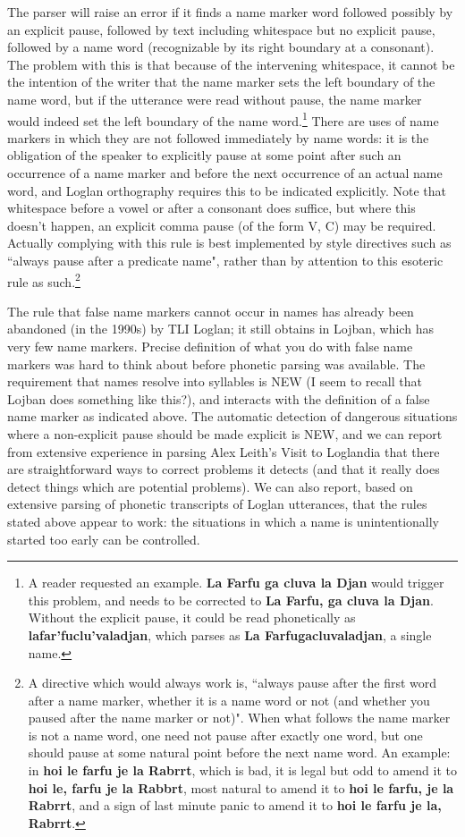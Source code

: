 \documentclass[12pt]{book}
\begin{document}
The parser will raise an error if it finds a name marker word followed possibly by an explicit pause, followed by text including whitespace but no explicit pause, followed by a name word (recognizable by its right boundary at a consonant). The problem with this is that because of the intervening whitespace, it cannot be  the intention of the writer that the name marker sets the left boundary of the name word, but if the utterance were read without pause, the name marker would indeed set the left boundary of the name word.\footnote{A reader requested an example.  {\bf La Farfu ga cluva la Djan} would trigger this problem, and needs to be corrected to {\bf La Farfu, ga cluva la Djan}.  Without the explicit pause, it could be read phonetically as {\bf lafar'fuclu'valadjan}, which parses as {\bf La Farfugacluvaladjan}, a single name.}  There are uses of name markers in which they are not followed immediately by name words:  it is the obligation of the speaker to explicitly pause at some point after such
an occurrence of a name marker and before the next occurrence of an actual name word, and Loglan orthography requires this to be indicated explicitly.  Note that whitespace before a vowel or after a consonant does suffice, but where this doesn't happen, an explicit comma pause (of the form V, C) may be required.  Actually complying with this rule is best implemented by style directives such as ``always pause after a predicate name", rather than by attention to this esoteric rule as such.\footnote{A directive which would always work is, ``always pause after the first word after a name marker, whether it is a name word or not (and whether you paused after the name marker or not)".  When what follows the name marker is not a name word, one need not pause after exactly one word, but one should pause at some natural point before the next name word.  An example:  in {\bf hoi le farfu je la Rabrrt}, which is bad, it is legal but odd to amend it to {\bf hoi le, farfu je la Rabbrt}, most natural to amend it to {\bf hoi le farfu, je la Rabrrt}, and a sign of last minute panic to amend it to {\bf hoi le farfu je la, Rabrrt}.}

The rule that false name markers cannot occur in names has already been abandoned (in the 1990s) by TLI Loglan; it still obtains in Lojban, which has very few name markers.  Precise definition of what you do with false name markers was hard to think about before phonetic parsing was available.  The requirement that names resolve into syllables is NEW (I seem to recall that Lojban does something like this?), and interacts with the definition of a false name marker as indicated above.   The automatic detection of dangerous situations where a non-explicit pause should be made explicit is NEW, and we can report from extensive experience in parsing Alex Leith's Visit to Loglandia that there are straightforward ways to correct problems it detects (and that it really does detect things which are potential problems).  We can also report, based on extensive parsing of phonetic transcripts of Loglan utterances, that the rules stated above appear to work:  the situations in which a name is unintentionally started too early can be controlled.
\end{document}
